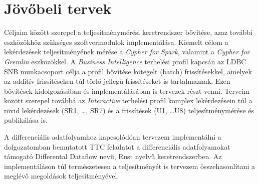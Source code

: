 \section{Jövőbeli tervek}

Céljaim között szerepel a teljesítménymérési keretrendszer bővítése, azaz további eszközökhöz szükséges szoftvermodulok implementálása. Kiemelt célom a lekérdezések teljesítményének mérése a \emph{Cypher for Spark}, valamint a \emph{Cypher for Gremlin} eszközökkel. A \emph{Business Intelligence} terhelési profil kapcsán az LDBC SNB munkacsoport célja a profil bővítése kötegelt (batch) frissítésekkel, amelyek az additív frissítéseken túl törlő jellegű frissítéseket is tartalmaznak. Ezen bővítések kidolgozásában és implementálásában is tervezek részt venni. Terveim között szerepel továbbá az \emph{Interactive} terhelési profil komplex lekérdezésein túl a rövid lekérdezések (SR1, \ldots, SR7) és a frissítések (U1, \ldots U8) teljesítménymérése és publikálása is. 

A differenciális adatfolyamhoz kapcsolódóan tervezem implementálni a dolgozatomban bemutatott TTC feladatot a differenciális adatfolyamokat támogató Differental Dataflow nevű, Rust nyelvű keretrendszerben. Az implementáláson túl természetesen a teljesítményét is tervezem összehasonlítani a meglévő megoldások teljesítményével.
